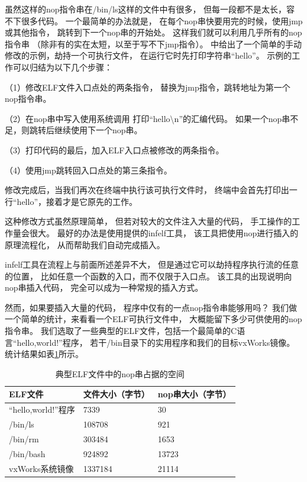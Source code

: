 虽然这样的nop指令串在/bin/ls这样的文件中有很多，
但每一段都不是太长，容不下很多代码。
一个最简单的办法就是，
在每个nop串快要用完的时候，使用jmp或其他指令，
跳转到下一个nop串的开始处。
这样我们就可以利用几乎所有的nop指令串
（除非有的实在太短，以至于写不下jmp指令）。
\cite{heike}中给出了一个简单的手动修改的示例，劫持一个可执行文件，
在运行它时先打印字符串“hello”。
示例的工作可以归结为以下几个步骤：

（1）修改ELF文件入口点处的两条指令，
替换为jmp指令，跳转地址为第一个nop指令串。

（2）在nop串中写入使用系统调用
打印“hello\textbackslash n”的汇编代码。
如果一个nop串不足，则跳转后继续使用下一个nop串。

（3）打印代码的最后，加入ELF入口点被修改的两条指令。

（4）使用jmp跳转回入口点处的第三条指令。

修改完成后，当我们再次在终端中执行该可执行文件时，
终端中会首先打印出一行“hello”，接着才是它原先的工作。

这种修改方式虽然原理简单，
但若对较大的文件注入大量的代码，
手工操作的工作量会很大。
最好的办法是使用\cite{infelf}提供的infelf工具，
该工具把使用nop进行插入的原理流程化，
从而帮助我们自动完成插入。

infelf工具在流程上与前面所述差异不大，
但是通过它可以劫持程序执行流的任意的位置，
比如任意一个函数的入口，而不仅限于入口点。
该工具的出现说明向nop串插入代码，
完全可以成为一种常规的插入方式。

然而，如果要插入大量的代码，
程序中仅有的一点nop指令串能够用吗？
我们做一个简单的统计，来看看一个ELF可执行文件中，
大概能留下多少可供使用的nop指令串。
我们选取了一些典型的ELF文件，包括一个最简单的C语言“hello,world!”程序，
若干/bin目录下的实用程序和我们的目标vxWorks镜像。
统计结果如表\ref{nopbytes}所示。

\begin{table}
  \centering
  \caption{典型ELF文件中的nop串占据的空间}
  \label{nopbytes}
  \begin{tabular}{l|l|l}
     \hline
     ELF文件       & 文件大小（字节）& nop串大小（字节） \\ \hline
 “hello,world!”程序  & 7339           & 30                 \\ \hline
     /bin/ls      & 108708          & 921                \\ \hline
     /bin/rm      & 303484         & 1653                \\ \hline  
     /bin/bash    & 924892        & 13723              \\ \hline
     vxWorks系统镜像 & 1337184        & 21114              \\ \hline
  \end{tabular}
\end{table}  

